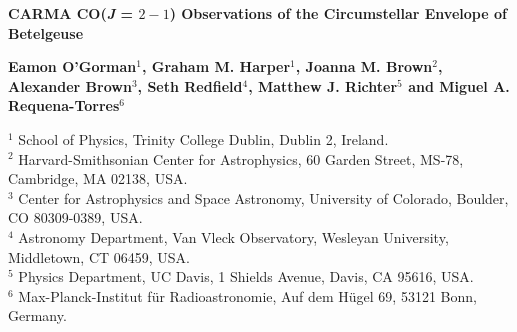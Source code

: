 

\textwidth 18cm
\textheight 23cm
\oddsidemargin -1cm
\topmargin 0cm
\parskip 0.15cm
\parindent 0pt
\small


{\large\bf{CARMA CO(\textit{J} = $2-1$) Observations of the Circumstellar Envelope of Betelgeuse}}

{\bf{ Eamon O'Gorman$^1$, Graham M. Harper$^1$, Joanna M. Brown$^2$, Alexander Brown$^3$, Seth Redfield$^4$, Matthew J. Richter$^5$ and Miguel A. Requena-Torres$^6$ }}

$^1$ {School of Physics, Trinity College Dublin, Dublin 2, Ireland.} \\
$^2$ {Harvard-Smithsonian Center for Astrophysics, 60 Garden Street, MS-78, Cambridge, MA 02138, USA.} \\
$^3$ {Center for Astrophysics and Space Astronomy, University of Colorado, Boulder, CO 80309-0389, USA.} \\
$^4$ {Astronomy Department, Van Vleck Observatory, Wesleyan University, Middletown, CT 06459, USA.} \\
$^5$ {Physics Department, UC Davis, 1 Shields Avenue, Davis, CA 95616, USA.} \\
$^6$ {Max-Planck-Institut f\"ur Radioastronomie, Auf dem H\"ugel 69, 53121 Bonn, Germany.}

